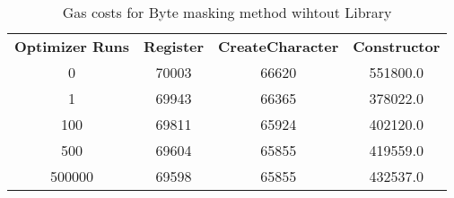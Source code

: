 \begin{table}[H]
	\centering
	\vspace*{-1ex}
	\scriptsize
	\caption{Gas costs for Byte masking method wihtout Library}
	\vspace{-1ex}
	\label{gas_bytemasking}
    \begin{tabular}{|c|c|c|c|}
        \hline
        \textbf{Optimizer Runs} & \textbf{Register} & \textbf{CreateCharacter} &  \textbf{Constructor} \\
        0      &    70003 &           66620 &     551800.0 \\
        1      &    69943 &           66365 &     378022.0 \\
        100    &    69811 &           65924 &     402120.0 \\
        500    &    69604 &           65855 &     419559.0 \\
        500000 &    69598 &           65855 &     432537.0 \\
        \hline
    \end{tabular}
\end{table}